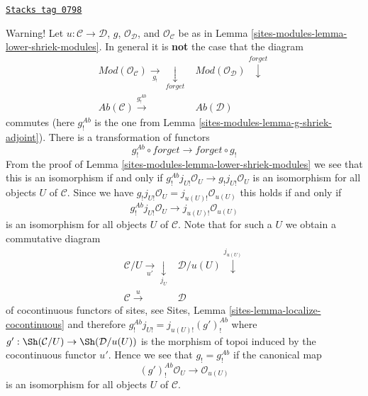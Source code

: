 \begin{remark}
\label{sites-modules-remark-when-shriek-equal}
\href{https://stacks.math.columbia.edu/tag/0798}{\texttt{Stacks tag 0798}}

Warning! Let $u : \mathcal{C} \to \mathcal{D}$, $g$, $\mathcal{O}_\mathcal{D}$,
and $\mathcal{O}_\mathcal{C}$ be as in Lemma \ref{sites-modules-lemma-lower-shriek-modules}.
In general it is {\bf not} the case that the diagram
$$
\begin{array}{cc}\textit{Mod}(\mathcal{O}_\mathcal{C}) \underset{g_!}{\longrightarrow}\underset{forget}{\downarrow} & \textit{Mod}(\mathcal{O}_\mathcal{D}) \overset{forget}{\downarrow} \\ \textit{Ab}(\mathcal{C}) \overset{g^{Ab}_!}{\longrightarrow} & \textit{Ab}(\mathcal{D})\end{array}
$$
commutes (here $g^{Ab}_!$ is the one from
Lemma \ref{sites-modules-lemma-g-shriek-adjoint}). There is a transformation
of functors
$$
g_!^{Ab} \circ forget \longrightarrow forget \circ g_!
$$
From the proof of Lemma \ref{sites-modules-lemma-lower-shriek-modules}
we see that this is an isomorphism if and only if
$g^{Ab}_!j_{U!}\mathcal{O}_U \to g_!j_{U!}\mathcal{O}_U$
is an isomorphism for all objects $U$ of $\mathcal{C}$.
Since we have $g_!j_{U!}\mathcal{O}_U = j_{u(U)!}\mathcal{O}_{u(U)}$
this holds if and only if
$$
g^{Ab}_!j_{U!}\mathcal{O}_U \longrightarrow j_{u(U)!}\mathcal{O}_{u(U)}
$$
is an isomorphism for all objects $U$ of $\mathcal{C}$. Note that for such a
$U$ we obtain a commutative diagram
$$
\begin{array}{cc}\mathcal{C}/U \underset{u'}{\longrightarrow}\underset{j_U}{\downarrow} & \mathcal{D}/u(U) \overset{j_{u(U)}}{\downarrow} \\ \mathcal{C} \overset{u}{\longrightarrow} & \mathcal{D}\end{array}
$$
of cocontinuous functors of sites, see
Sites, Lemma \ref{sites-lemma-localize-cocontinuous}
and therefore $g^{Ab}_!j_{U!} = j_{u(U)!}(g')^{Ab}_!$ where
$g' : \Sh(\mathcal{C}/U) \to \Sh(\mathcal{D}/u(U))$ is the morphism
of topoi induced by the cocontinuous functor $u'$.
Hence we see that $g_! = g^{Ab}_!$ if the canonical map
\begin{equation}
\label{equation-compare-on-localizations}
(g')^{Ab}_!\mathcal{O}_U \longrightarrow \mathcal{O}_{u(U)}
\end{equation}
is an isomorphism for all objects $U$ of $\mathcal{C}$.
\end{remark}

